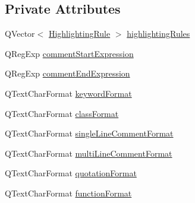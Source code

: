 \subsection*{Private Attributes}
\begin{DoxyCompactItemize}
\item 
Q\-Vector$<$ \hyperlink{struct_highlighter_1_1_highlighting_rule}{Highlighting\-Rule} $>$ \hyperlink{class_highlighter_aa23f8b3f4ddd1354f508b46d77897fe5}{highlighting\-Rules}
\item 
Q\-Reg\-Exp \hyperlink{class_highlighter_a67cdecd667929b4eefbc7057d58cd90b}{comment\-Start\-Expression}
\item 
Q\-Reg\-Exp \hyperlink{class_highlighter_a3baa1033bbdf70a16df42940968b72b4}{comment\-End\-Expression}
\item 
Q\-Text\-Char\-Format \hyperlink{class_highlighter_acf807339a8cd02097a81e455ef2686d2}{keyword\-Format}
\item 
Q\-Text\-Char\-Format \hyperlink{class_highlighter_a765a13081aa25d818c766b7f8e50f454}{class\-Format}
\item 
Q\-Text\-Char\-Format \hyperlink{class_highlighter_ad1ca0f6942b0451781d7e32f1781f22b}{single\-Line\-Comment\-Format}
\item 
Q\-Text\-Char\-Format \hyperlink{class_highlighter_ad4661760f22cf913b696ec90dea994c0}{multi\-Line\-Comment\-Format}
\item 
Q\-Text\-Char\-Format \hyperlink{class_highlighter_a3d4bf96c8ea27ba18bca4adc6b306db8}{quotation\-Format}
\item 
Q\-Text\-Char\-Format \hyperlink{class_highlighter_a7e02cd8caee678c1256998c88d30e241}{function\-Format}
\end{DoxyCompactItemize}



